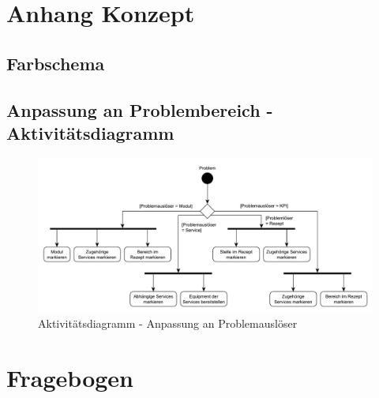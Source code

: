 
\chapter{Anhang Konzept}
\section{Farbschema}

\section{Anpassung an Problembereich - Aktivitätsdiagramm}

\begin{figure}[htbp]
\centering
\includegraphics[angle=90,scale=0.6]{DA_files/UML/Anhang/Aktivitaetsdiagramm-Problem.pdf}
\caption{Aktivitätsdiagramm - Anpassung an Problemauslöser}
\end{figure}

\chapter{Fragebogen}
\label{A:Fragebogen-Validierung}

